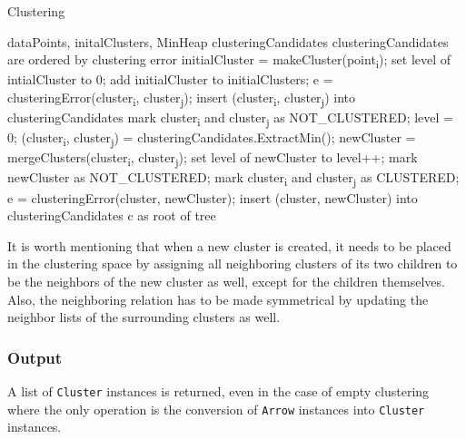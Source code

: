 \begin{algorithm}[H]
\caption{Clustering}
\begin{algorithmic}[1]

\Require dataPoints, initalClusters, MinHeap clusteringCandidates \Comment clusteringCandidates are ordered by clustering error
\Statex
{}
	\State initialCluster = makeCluster(point\textsubscript{i});
    \State set level of intialCluster to 0;
    \State add initialCluster to initialClusters;
\EndFor
\Statex
{}
    	\State e = clusteringError(cluster\textsubscript{i}, cluster\textsubscript{j});
        \State insert (cluster\textsubscript{i}, cluster\textsubscript{j}) into clusteringCandidates
        \State mark cluster\textsubscript{i} and cluster\textsubscript{j} as NOT\_CLUSTERED;
    \EndFor
\EndFor
\Statex
\State level = 0;
	\State (cluster\textsubscript{i}, cluster\textsubscript{j}) = clusteringCandidates.ExtractMin();
    	\State newCluster = mergeClusters(cluster\textsubscript{i}, cluster\textsubscript{j});
        \State set level of newCluster to level++;
		\State mark newCluster as NOT\_CLUSTERED;
        \State mark cluster\textsubscript{i} and cluster\textsubscript{j} as CLUSTERED;
        	\State e = clusteringError(cluster, newCluster);
            \State insert (cluster, newCluster) into clusteringCandidates
        \EndFor
    \EndIf
\EndWhile
\Statex
\Return c as root of tree
\end{algorithmic}
\end{algorithm}

It is worth mentioning that when a new cluster is created, it needs to be placed in the clustering space by assigning all neighboring clusters of its two children to be the neighbors of the new cluster as well, except for the children themselves. Also, the neighboring relation has to be made symmetrical by updating the neighbor lists of the surrounding clusters as well.

\subsubsection{Output}

A list of \verb+Cluster+ instances is returned, even in the case of empty clustering where the only operation is the conversion of \verb+Arrow+ instances into \verb+Cluster+ instances.

